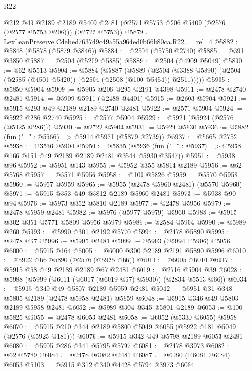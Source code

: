 \begin{lexlean}{R22}
\begin{coremodule}
      @212
      @49
      @2189
      @2189
      @5409
      @2481
      (@2571 @5753 @206 @5409 (@2576 (@2577 @5753 @206)))
      (@2722 @5753))
@5879 := LexLeanPreserve.Cdebed7637d9c49a55a964ed0b66b80ca.R22.__rel_4
@5882 := @5848 (@5878 (@5879 @3846))
@5884 := @2504 (@5750 @2740)
@5885 := @391 @3850
@5887 := @2504 (@5209 @5885)
@5889 := @2504 (@4909 @5049)
@5890 := @62 @5513
@5904 := @5884
    (@5887
      (@5889
        (@2504 (@3388 @5890) (@2504 (@2585 (@4501 @5420)) (@2504 (@2508 (@100 @5454)) @2511)))))
@5905 := @5850 @5904
@5909 := @5905 @206 @295 @2191 @4398
@5911 := @2478 @2740 @2481
@5914 := @5909 @5911 (@2488 @4401)
@5915 := @2603 @5904
@5921 := @5915 @293 @49 @2189 @2189 @2740 @2481
@5922 := @2571 @5904
@5924 := @5922 @286 @2740
@5925 := @2577 @5904
@5929 := @5921 (@5924 (@2576 (@5925 @286)))
@5930 := @2722 @5904
@5931 := @5929 @5930
@5936 := @5882 (fun ("_" : @5666) => @5914 @5931 (@5879 @2739))
@5937 := @5665 @2752
@5938 := @3536 @5904
@5950 := @5835
    (@5936 (fun ("_" : @5937) => @5938 @166 @151 @49 @2189 @2189 @2481 @3544 @5930 @3547))
@5951 := @5938 @96
@5952 := @5951 @143
@5955 := @5952 @355 @5814 @2189
@5956 := @62 @5768
@5957 := @5571 @5956
@5958 := @100 @5826
@5959 := @5570 @5958
@5960 := @5957 @5959
@5965 := @5955 (@2478 @5960 @2481) (@5570 @5960)
@5971 := @5915 @353 @49 @5812 @2189 @5960 @2481
@5973 := @5938 @90 @94
@5976 := @5973 @352 @5810 @2189
@5977 := @2478 @5956
@5979 := @2478 @5959 @2481
@5982 := @5976 (@5977 @5979) @5960
@5988 := @5915 @302 @351 @5771 @5809 @5956 @5979
@5989 := @2584 @5904
@5990 := @5989 @260
@5993 := @5990 @301 @2192 @5770
@5994 := @2478 @5890
@5995 := @2478 @67
@5996 := @5995 @2481
@5999 := @5993 (@5994 @5996) @5956
@6000 := @5915 @164
@6005 := @6000 @300 @2189 @2191 @5890 @5996
@6010 := @5922 @66 @5890 (@2576 (@5925 @66))
@6011 := @6005 @6010
@6017 := @5915 @68 @49 @2189 @2189 @67 @2481
@6019 := @2716 @5904 @39
@6028 := @5988 (@5999 (@6011 (@6017 (@6019 @67) @5930)) (@2834 @5513 @66))
@6034 := @5915 @349 @49 @5807 @2189 @5959 @2481
@6042 := @5951 @31 @348 @5805 @2189 (@2478 @5958 @2481) @5959
@6048 := @5915 @346 @49 @5803 @2189 @5958 @2481
@6052 := @5989 @304 @345 @5801 @2189
@6053 := @100 @5825
@6055 := @2478 @6053 @2481
@6058 := @6052 (@5330 @6055) @5958
@6070 := @5915 @210 @344 @2189 @5800 @5049 @6055 (@5922 @181 @5049 (@2576 (@5925 @181)))
@6076 := @5915 @342 @49 @5798 @2189 @6053 @2481
@6080 := @5905 @286 @341 @5795 @5797
@6081 := @2478 @3973
@6082 := @62 @5789
@6084 := @2478 @6082 @2481
@6087 := @6080 (@6081 @6084) @6053
@6103 := @5915
    @312
    @340
    @4428
    @5794
    @3973
    @6084

\end{coremodule}
\end{lexlean}
